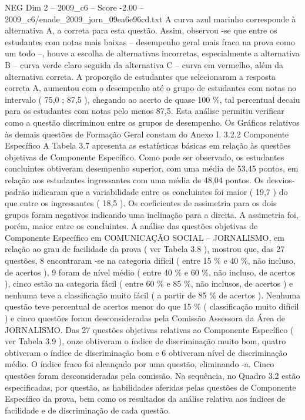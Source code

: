 \begin{textsample}{NEG Dim 2 – 2009\_c6 – Score -2.00 – 2009\_c6/enade\_2009\_jorn\_09ea6e96cd.txt}
A curva azul marinho corresponde à alternativa A, a correta para esta questão.
Assim, observou -se que entre os estudantes com notas mais baixas – desempenho geral mais fraco na prova como um todo –, houve a escolha de alternativas incorretas, especialmente a alternativa B – curva verde claro seguida da alternativa C – curva em vermelho, além da alternativa correta.
A proporção de estudantes que selecionaram a resposta correta A, aumentou com o desempenho até o grupo de estudantes com notas no intervalo ( 75,0 ; 87,5 ), chegando ao acerto de quase 100 \%, tal percentual decaiu para os estudantes com notas pelo menos 87,5.
Esta análise permitiu verificar como a questão discriminou entre os grupos de desempenho.
Os Gráficos relativos às demais questões de Formação Geral constam do Anexo I. 3.2.2 Componente Específico A Tabela 3.7 apresenta as estatísticas básicas em relação às questões objetivas de Componente Específico.
Como pode ser observado, os estudantes concluintes obtiveram desempenho superior, com uma média de 53,45 pontos, em relação aos estudantes ingressantes com uma média de 48,04 pontos.
Os desvios-padrão indicaram que a variabilidade entre os concluintes foi maior ( 19,7 ) do que entre os ingressantes ( 18,5 ).
Os coeficientes de assimetria para os dois grupos foram negativos indicando uma inclinação para a direita.
A assimetria foi, porém, maior entre os concluintes.
A análise das questões objetivas de Componente Específico em COMUNICAÇÃO SOCIAL – JORNALISMO, em relação ao grau de facilidade da prova ( ver Tabela 3.8 ), mostrou que, das 27 questões, 8 encontraram -se na categoria difícil ( entre 15 \% e 40 \%, não incluso, de acertos ), 9 foram de nível médio ( entre 40 \% e 60 \%, não incluso, de acertos ), cinco estão na categoria fácil ( entre 60 \% e 85 \%, não inclusos, de acertos ) e nenhuma teve a classificação muito fácil ( a partir de 85 \% de acertos ).
Nenhuma questão teve percentual de acertos menor do que 15 \% ( classificação muito difícil ) e cinco questões foram desconsideradas pela Comissão Assessora da Área de JORNALISMO.
Das 27 questões objetivas relativas ao Componente Específico ( ver Tabela 3.9 ), onze obtiveram o índice de discriminação muito bom, quatro obtiveram o índice de discriminação bom e 6 obtiveram nível de discriminação médio.
O índice fraco foi alcançado por uma questão, eliminando -a.
Cinco questões foram desconsideradas pela comissão.
Na sequência, no Quadro 3.2 estão especificadas, por questão, as habilidades aferidas pelas questões de Componente Específico da prova, bem como os resultados da análise relativa aos índices de facilidade e de discriminação de cada questão.

\end{textsample}
